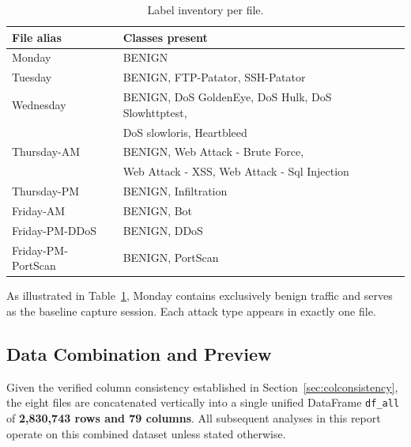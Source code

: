 \documentclass[12pt,a4paper]{article}
\begin{document}
\begin{table}[H]
    \centering
    \caption{Label inventory per file.}
    \label{tab:label_inventory}
    \begin{tabular}{|l|l|}
        \hline
        \textbf{File alias} & \textbf{Classes present}                           \\
        \hline
        Monday              & BENIGN                                             \\
        \hline
        Tuesday             & BENIGN, FTP-Patator, SSH-Patator                   \\
        \hline
        Wednesday           & BENIGN, DoS GoldenEye, DoS Hulk, DoS Slowhttptest, \\
                            & DoS slowloris, Heartbleed                          \\
        \hline
        Thursday-AM         & BENIGN, Web Attack - Brute Force,                  \\
                            & Web Attack - XSS, Web Attack - Sql Injection       \\
        \hline
        Thursday-PM         & BENIGN, Infiltration                               \\
        \hline
        Friday-AM           & BENIGN, Bot                                        \\
        \hline
        Friday-PM-DDoS      & BENIGN, DDoS                                       \\
        \hline
        Friday-PM-PortScan  & BENIGN, PortScan                                   \\
        \hline
    \end{tabular}
\end{table}

As illustrated in Table~\ref{tab:label_inventory}, Monday contains exclusively
benign traffic and serves as the baseline capture session. Each attack type appears
in exactly one file.

\subsection{Data Combination and Preview}

Given the verified column consistency established in Section~\ref{sec:colconsistency},
the eight files are concatenated vertically into a single unified DataFrame
\texttt{df\_all} of \textbf{2,830,743 rows and 79 columns}. All subsequent analyses
in this report operate on this combined dataset unless stated otherwise.
\end{document}
